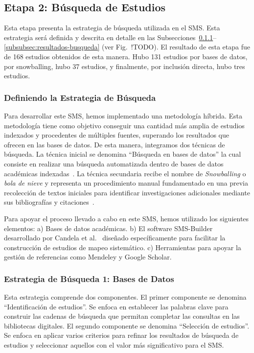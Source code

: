 \subsection{Etapa 2: Búsqueda de Estudios}

Esta etapa presenta la estrategia de búsqueda utilizada en el SMS\@. Esta estrategia será definida y descrita en detalle en las Subsecciones~\ref{subsubsec:estrategia-busqueda}--\ref{subsubsec:resultados-busqueda} (ver Fig.~!TODO). %
 El resultado de esta etapa fue de 168 estudios obtenidos de esta manera. Hubo 131 estudios por bases de datos, por snowballing, hubo 37 estudios, y finalmente, por inclusión directa, hubo tres estudios.
\mbox{}\\

 
\subsubsection{Definiendo la Estrategia de Búsqueda}\label{subsubsec:estrategia-busqueda}
Para desarrollar este SMS, hemos implementado una metodología híbrida. Esta metodología tiene como objetivo conseguir una cantidad más
amplia de estudios indexados y procedentes de múltiples fuentes, superando los resultados que ofrecen en las bases de datos. De esta manera, integramos dos técnicas de búsqueda. La técnica inicial se denomina ``Búsqueda en bases de datos'' la cual consiste en realizar una búsqueda automatizada dentro de bases de datos académicas indexadas~\cite{Jalai-01}. La técnica secundaria recibe el
nombre de \textit{Snowballing} o  \textit{bola de nieve} y representa un procedimiento manual fundamentado en una  previa recolección de textos iniciales para
identificar investigaciones adicionales mediante sus bibliografías y citaciones~\cite{Jalai-01,Goodman-01}.

Para apoyar el proceso llevado a cabo en este SMS, hemos utilizado los siguientes elementos: a) Bases de datos académicas. b) El software SMS-Builder desarrollado por Candela et al.~\cite{sms-builder-repo} diseñado específicamente para facilitar la construcción de estudios de mapeo sistemático. c) Herramientas para apoyar la gestión de referencias como Mendeley y Google Scholar. %


\subsubsection{Estrategia de Búsqueda 1: Bases de Datos}
Esta estrategia comprende dos componentes. El primer componente se denomina ``Identificación de estudios''. Se enfoca en establecer las palabras clave para construir las cadenas de búsqueda que permitan completar las consultas en las bibliotecas digitales. El segundo componente se denomina ``Selección de estudios''. Se enfoca en aplicar varios criterios para refinar los resultados de búsqueda de estudios y seleccionar aquellos con el valor más significativo para el SMS.\@

